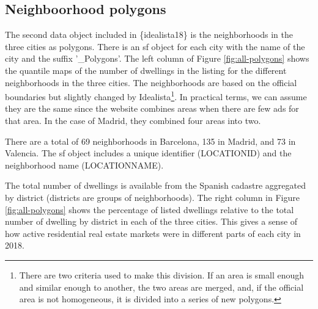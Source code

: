 \documentclass[Royal,times,sageh]{sagej}
\begin{document}
\hypertarget{neighboorhood-polygons}{%
\subsection{Neighboorhood polygons}\label{neighboorhood-polygons}}

The second data object included in \{idealista18\} is the neighborhoods
in the three cities as polygons. There is an sf object for each city
with the name of the city and the suffix '\_Polygons'. The left column
of Figure \ref{fig:all-polygons} shows the quantile maps of the number
of dwellings in the listing for the different neighborhoods in the three
cities. The neighborhoods are based on the official boundaries but
slightly changed by
Idealista\footnote{There are two criteria used to make this division. If an area is small enough and similar enough to another, the two areas are merged, and, if the official area is not homogeneous, it is divided into a series of new polygons.}.
In practical terms, we can assume they are the same since the website
combines areas when there are few ads for that area. In the case of
Madrid, they combined four areas into two.

There are a total of 69 neighborhoods in Barcelona, 135 in Madrid, and
73 in Valencia. The sf object includes a unique identifier (LOCATIONID)
and the neighborhood name (LOCATIONNAME).

The total number of dwellings is available from the Spanish cadastre
aggregated by district (districts are groups of neighborhoods). The
right column in Figure \ref{fig:all-polygons} shows the percentage of
listed dwellings relative to the total number of dwelling by district in
each of the three cities. This gives a sense of how active residential
real estate markets were in different parts of each city in 2018.
\end{document}
